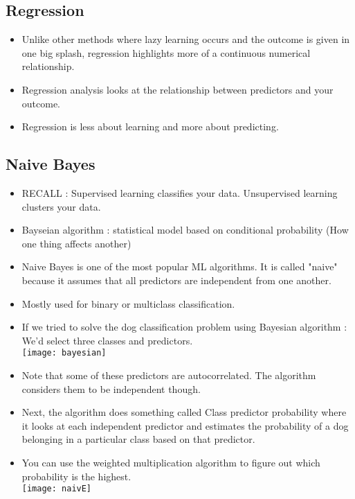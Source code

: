 \documentclass[11pt, oneside]{article}   	%
\begin{document}
\subsection{Regression}
\begin{itemize}
\item Unlike other methods where lazy learning occurs and the outcome is given in one big splash, regression highlights more of a continuous numerical relationship.
\item Regression analysis looks at the relationship between predictors and your outcome.
\item Regression is less about learning and more about predicting.
\end{itemize}
\subsection{Naive Bayes}
\begin{itemize}
\item RECALL : Supervised learning classifies your data. Unsupervised learning clusters your data.
\item Bayseian algorithm : statistical model based on conditional probability (How one thing affects another)
\item Naive Bayes is one of the most popular ML algorithms. It is called "naive" because it assumes that all predictors are independent from one another.
\item Mostly used for binary or multiclass classification.
\item If we tried to solve the dog classification problem using Bayesian algorithm : We'd select three classes and predictors.
\bigskip \\
\texttt{[image: bayesian]}
\bigskip \\
\item Note that some of these predictors are autocorrelated. The algorithm considers them to be independent though.
\item Next, the algorithm does something called Class predictor probability where it looks at each independent predictor and estimates the probability of a dog belonging in a particular class based on that predictor.
\item You can use the weighted multiplication algorithm to figure out which probability is the highest.
\bigskip \\
\texttt{[image: naivE]}
\bigskip \\
\end{itemize}
\end{document}
